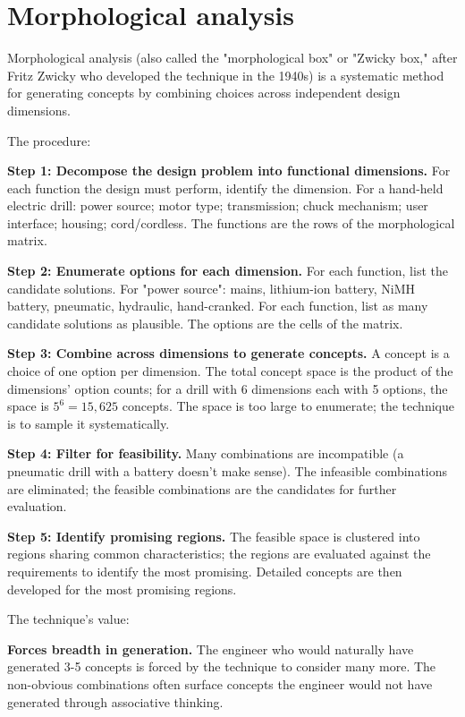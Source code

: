 \section{Morphological analysis}

Morphological analysis (also called the "morphological box" or "Zwicky box," after Fritz Zwicky who developed the technique in the 1940s) is a systematic method for generating concepts by combining choices across independent design dimensions.

The procedure:

\textbf{Step 1: Decompose the design problem into functional dimensions.} For each function the design must perform, identify the dimension. For a hand-held electric drill: power source; motor type; transmission; chuck mechanism; user interface; housing; cord/cordless. The functions are the rows of the morphological matrix.

\textbf{Step 2: Enumerate options for each dimension.} For each function, list the candidate solutions. For "power source": mains, lithium-ion battery, NiMH battery, pneumatic, hydraulic, hand-cranked. For each function, list as many candidate solutions as plausible. The options are the cells of the matrix.

\textbf{Step 3: Combine across dimensions to generate concepts.} A concept is a choice of one option per dimension. The total concept space is the product of the dimensions' option counts; for a drill with 6 dimensions each with 5 options, the space is $5^6 = 15{,}625$ concepts. The space is too large to enumerate; the technique is to sample it systematically.

\textbf{Step 4: Filter for feasibility.} Many combinations are incompatible (a pneumatic drill with a battery doesn't make sense). The infeasible combinations are eliminated; the feasible combinations are the candidates for further evaluation.

\textbf{Step 5: Identify promising regions.} The feasible space is clustered into regions sharing common characteristics; the regions are evaluated against the requirements to identify the most promising. Detailed concepts are then developed for the most promising regions.

The technique's value:

\textbf{Forces breadth in generation.} The engineer who would naturally have generated 3-5 concepts is forced by the technique to consider many more. The non-obvious combinations often surface concepts the engineer would not have generated through associative thinking.

